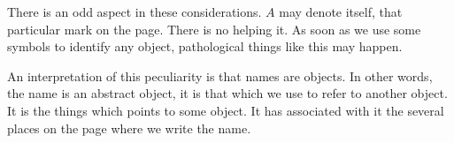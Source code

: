 
There is an odd aspect in these considerations.
$A$ may denote itself, that particular mark on the page.
There is no helping it.
As soon as we use some symbols to identify any object, pathological things like this may happen.

An interpretation of this peculiarity is that names are objects.
In other words, the name is an abstract object, it is that which we use to refer to another object.
It is the things which points to some object.
It has associated with it the several places on the page where we write the name.


%
%
%
%
%
%
%
%
%
%
%
%
